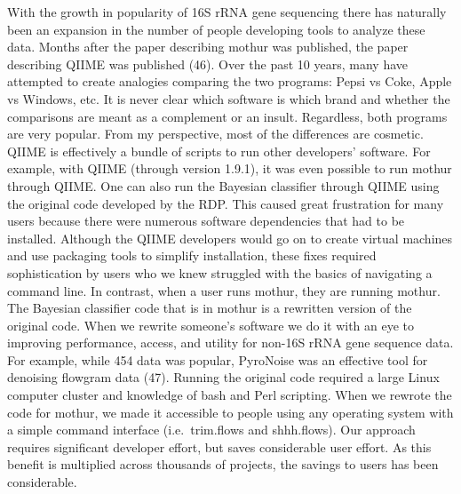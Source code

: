 \documentclass[11pt,]{article}
\begin{document}
With the growth in popularity of 16S rRNA gene sequencing there has
naturally been an expansion in the number of people developing tools to
analyze these data. Months after the paper describing mothur was
published, the paper describing QIIME was published (46). Over the past
10 years, many have attempted to create analogies comparing the two
programs: Pepsi vs Coke, Apple vs Windows, etc. It is never clear which
software is which brand and whether the comparisons are meant as a
complement or an insult. Regardless, both programs are very popular.
From my perspective, most of the differences are cosmetic. QIIME is
effectively a bundle of scripts to run other developers' software. For
example, with QIIME (through version 1.9.1), it was even possible to run
mothur through QIIME. One can also run the  Bayesian
classifier through QIIME using the original code developed by the RDP.
This caused great frustration for many users because there were numerous
software dependencies that had to be installed. Although the QIIME
developers would go on to create virtual machines and use packaging
tools to simplify installation, these fixes required sophistication by
users who we knew struggled with the basics of navigating a command
line. In contrast, when a user runs mothur, they are running mothur. The
 Bayesian classifier code that is in mothur is a rewritten
version of the original code. When we rewrite someone's software we do
it with an eye to improving performance, access, and utility for non-16S
rRNA gene sequence data. For example, while 454 data was popular,
PyroNoise was an effective tool for denoising flowgram data (47).
Running the original code required a large Linux computer cluster and
knowledge of bash and Perl scripting. When we rewrote the code for
mothur, we made it accessible to people using any operating system with
a simple command interface (i.e.~trim.flows and shhh.flows). Our
approach requires significant developer effort, but saves considerable
user effort. As this benefit is multiplied across thousands of projects,
the savings to users has been considerable.
\end{document}
